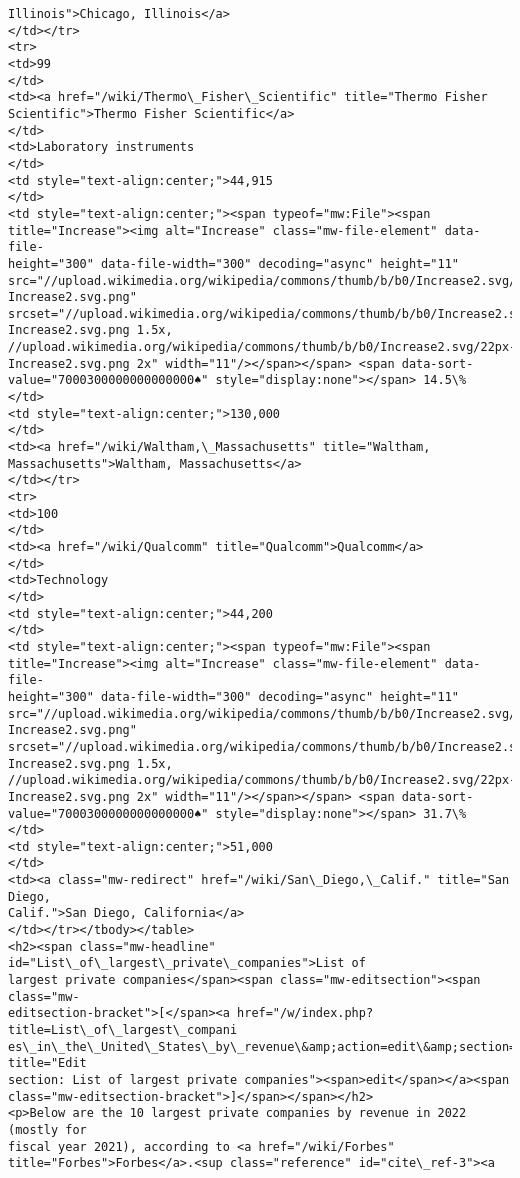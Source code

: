 \documentclass[11pt]{article}
\begin{document}
\begin{Verbatim}[commandchars=\\\{\}]
Illinois">Chicago, Illinois</a>
</td></tr>
<tr>
<td>99
</td>
<td><a href="/wiki/Thermo\_Fisher\_Scientific" title="Thermo Fisher
Scientific">Thermo Fisher Scientific</a>
</td>
<td>Laboratory instruments
</td>
<td style="text-align:center;">44,915
</td>
<td style="text-align:center;"><span typeof="mw:File"><span
title="Increase"><img alt="Increase" class="mw-file-element" data-file-
height="300" data-file-width="300" decoding="async" height="11"
src="//upload.wikimedia.org/wikipedia/commons/thumb/b/b0/Increase2.svg/11px-
Increase2.svg.png"
srcset="//upload.wikimedia.org/wikipedia/commons/thumb/b/b0/Increase2.svg/17px-
Increase2.svg.png 1.5x,
//upload.wikimedia.org/wikipedia/commons/thumb/b/b0/Increase2.svg/22px-
Increase2.svg.png 2x" width="11"/></span></span> <span data-sort-
value="7000300000000000000♠" style="display:none"></span> 14.5\%
</td>
<td style="text-align:center;">130,000
</td>
<td><a href="/wiki/Waltham,\_Massachusetts" title="Waltham,
Massachusetts">Waltham, Massachusetts</a>
</td></tr>
<tr>
<td>100
</td>
<td><a href="/wiki/Qualcomm" title="Qualcomm">Qualcomm</a>
</td>
<td>Technology
</td>
<td style="text-align:center;">44,200
</td>
<td style="text-align:center;"><span typeof="mw:File"><span
title="Increase"><img alt="Increase" class="mw-file-element" data-file-
height="300" data-file-width="300" decoding="async" height="11"
src="//upload.wikimedia.org/wikipedia/commons/thumb/b/b0/Increase2.svg/11px-
Increase2.svg.png"
srcset="//upload.wikimedia.org/wikipedia/commons/thumb/b/b0/Increase2.svg/17px-
Increase2.svg.png 1.5x,
//upload.wikimedia.org/wikipedia/commons/thumb/b/b0/Increase2.svg/22px-
Increase2.svg.png 2x" width="11"/></span></span> <span data-sort-
value="7000300000000000000♠" style="display:none"></span> 31.7\%
</td>
<td style="text-align:center;">51,000
</td>
<td><a class="mw-redirect" href="/wiki/San\_Diego,\_Calif." title="San Diego,
Calif.">San Diego, California</a>
</td></tr></tbody></table>
<h2><span class="mw-headline" id="List\_of\_largest\_private\_companies">List of
largest private companies</span><span class="mw-editsection"><span class="mw-
editsection-bracket">[</span><a href="/w/index.php?title=List\_of\_largest\_compani
es\_in\_the\_United\_States\_by\_revenue\&amp;action=edit\&amp;section=2" title="Edit
section: List of largest private companies"><span>edit</span></a><span
class="mw-editsection-bracket">]</span></span></h2>
<p>Below are the 10 largest private companies by revenue in 2022 (mostly for
fiscal year 2021), according to <a href="/wiki/Forbes"
title="Forbes">Forbes</a>.<sup class="reference" id="cite\_ref-3"><a

\end{Verbatim}
\end{document}
